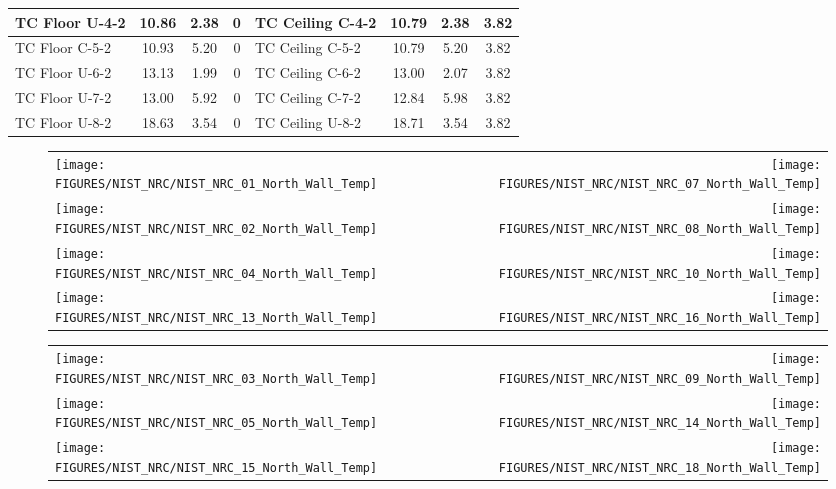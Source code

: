 \begin{table}[ht]
\begin{center}
\begin{tabular}{|l|c|c|c||l|c|c|c|}
TC Floor U-4-2    & 10.86 & 2.38 & 0        & TC Ceiling C-4-2  & 10.79 & 2.38  & 3.82      \\ \hline
TC Floor C-5-2    & 10.93 & 5.20 & 0        & TC Ceiling C-5-2  & 10.79 & 5.20  & 3.82      \\ \hline
TC Floor U-6-2    & 13.13 & 1.99 & 0        & TC Ceiling C-6-2  & 13.00 & 2.07  & 3.82      \\ \hline
TC Floor U-7-2    & 13.00 & 5.92 & 0        & TC Ceiling C-7-2  & 12.84 & 5.98  & 3.82      \\ \hline
TC Floor U-8-2    & 18.63 & 3.54 & 0        & TC Ceiling U-8-2  & 18.71 & 3.54  & 3.82      \\ \hline
\end{tabular}
\end{center}
\label{NIST_NRC_Wall_Coords}
\end{table}

\newpage

\begin{figure}[p]
\begin{tabular*}{\textwidth}{l@{\extracolsep{\fill}}r}
\texttt{[image: FIGURES/NIST\_NRC/NIST\_NRC\_01\_North\_Wall\_Temp]} &
\texttt{[image: FIGURES/NIST\_NRC/NIST\_NRC\_07\_North\_Wall\_Temp]} \\
\texttt{[image: FIGURES/NIST\_NRC/NIST\_NRC\_02\_North\_Wall\_Temp]} &
\texttt{[image: FIGURES/NIST\_NRC/NIST\_NRC\_08\_North\_Wall\_Temp]} \\
\texttt{[image: FIGURES/NIST\_NRC/NIST\_NRC\_04\_North\_Wall\_Temp]} &
\texttt{[image: FIGURES/NIST\_NRC/NIST\_NRC\_10\_North\_Wall\_Temp]} \\
\texttt{[image: FIGURES/NIST\_NRC/NIST\_NRC\_13\_North\_Wall\_Temp]} &
\texttt{[image: FIGURES/NIST\_NRC/NIST\_NRC\_16\_North\_Wall\_Temp]}
\end{tabular*}
\label{NIST_NRC_North_Wall_Temp_Closed}
\end{figure}

\begin{figure}[p]
\begin{tabular*}{\textwidth}{l@{\extracolsep{\fill}}r}
\texttt{[image: FIGURES/NIST\_NRC/NIST\_NRC\_03\_North\_Wall\_Temp]} &
\texttt{[image: FIGURES/NIST\_NRC/NIST\_NRC\_09\_North\_Wall\_Temp]} \\
\texttt{[image: FIGURES/NIST\_NRC/NIST\_NRC\_05\_North\_Wall\_Temp]} &
\texttt{[image: FIGURES/NIST\_NRC/NIST\_NRC\_14\_North\_Wall\_Temp]} \\
\texttt{[image: FIGURES/NIST\_NRC/NIST\_NRC\_15\_North\_Wall\_Temp]} &
\texttt{[image: FIGURES/NIST\_NRC/NIST\_NRC\_18\_North\_Wall\_Temp]}
\end{tabular*}
\label{NIST_NRC_North_Wall_Temp_Open}
\end{figure}

